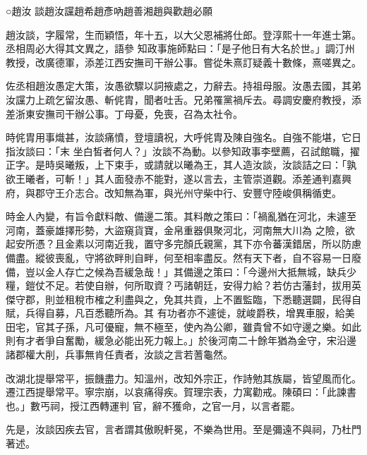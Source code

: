 
\begin{pinyinscope}

 ○趙汝
 談趙汝讜趙希趙彥吶趙善湘趙與歡趙必願



 趙汝談，字履常，生而穎悟，年十五，以大父恩補將仕郎。登淳熙十一年進士第。丞相周必大得其文異之，語參
 知政事施師點曰：「是子他日有大名於世。」調汀州教授，改廣德軍，添差江西安撫司干辦公事。嘗從朱熹訂疑義十數條，熹嗟異之。



 佐丞相趙汝愚定大策，汝愚欲驟以詞掖處之，力辭去。持祖母服。汝愚去國，其弟汝讜力上疏乞留汝愚、斬侂胄，聞者吐舌。兄弟罹黨禍斥去。尋調安慶府教授，添差浙東安撫司干辦公事。丁母憂，免喪，召為太社令。



 時侂胄用事熾甚，汝談痛憤，登壇讀祝，大呼侂胄及陳自強名。自強不能堪，它日指汝談曰：「末
 坐白皙者何人？」汝談不為動。以參知政事李壁薦，召試館職，擢正字。是時吳曦叛，上下束手，或請就以曦為王，其人造汝談，汝談詰之曰：「孰欲王曦者，可斬！」其人面發赤不能對，遂以言去，主管崇道觀。添差通判嘉興府，與郡守王介志合。改知無為軍，與光州守柴中行、安豐守陸峻俱稱循吏。



 時金人內變，有旨令獻料敵、備邊二策。其料敵之策曰：「禍亂猶在河北，未遽至河南，蓋豪雄擇形勢，大盜窺貨寶，金帛重器俱聚河北，河南無大川為
 之險，欲起安所憑？且金素以河南近我，置守多完顏氏親黨，其下亦令蕃漢錯居，所以防慮備盡。縱彼喪亂，守將欲畔則自畔，何至相率盡反。然有天下者，自不容易一日廢備，豈以金人存亡之候為吾緩急哉！」其備邊之策曰：「今邊州大抵無城，缺兵少糧，鎧仗不足。若使自辦，何所取資？丐諸朝廷，安得力給？若仿古藩封，拔用英傑守郡，則並租稅市榷之利盡與之，免其共貢，上不置監臨，下悉聽選闢，民得自賦，兵得自募，凡百悉聽所為。其
 有功者亦不遽徙，就峻爵秩，增異車服，給美田宅，官其子孫，凡可優寵，無不極至，使內為公卿，雖貴曾不如守邊之樂。如此則有才者爭自奮勵，緩急必能出死力報上。」於後河南二十餘年猶為金守，宋沿邊諸郡權大削，兵事無肯任責者，汝談之言若蓍龜然。



 改湖北提舉常平，振饑盡力。知溫州，改知外宗正，作詩勉其族屬，皆望風而化。遷江西提舉常平。寧宗崩，以哀痛得疾。賀理宗表，力寓勸戒。陳碩曰：「此諫書也。」數丐祠，授江西轉運判
 官，辭不獲命，之官一月，以言者罷。



 先是，汝談因疾去官，言者謂其傲睨軒冕，不樂為世用。至是彌遠不與祠，乃杜門著述。




\end{pinyinscope}
